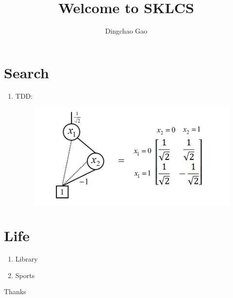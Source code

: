 \documentclass[18 pt]{beamer}
\title{Welcome to SKLCS}
\author[Gcc]{Dingchao Gao}
\begin{document}
\begin{frame}[plain]
  \titlepage
\end{frame}
\section{Search}
\begin{frame}
  \begin{enumerate}
    \item TDD:
    \begin{figure}
      \includegraphics[width = .8\textwidth]{TDD_H_gate2.png}
    \end{figure}
  \end{enumerate}
\end{frame}
\section{Life}
\begin{frame}
  \begin{figure}
    \centering
  \end{figure}
\end{frame}
\begin{frame}
  \begin{figure}
  \end{figure}
\end{frame}
\begin{frame}
  \begin{enumerate}
    \item Library
    \item Sports
  \end{enumerate}
\end{frame}
\begin{frame}
  \centering
  \Huge{Thanks}
\end{frame}
\end{document}

